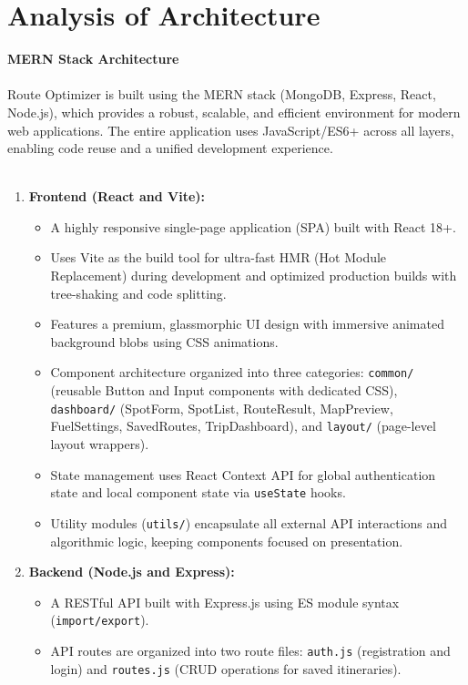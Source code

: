 \section{Analysis of Architecture}
{\large \textbf{MERN Stack Architecture}}\\\\
Route Optimizer is built using the MERN stack (MongoDB, Express, React, Node.js), which provides a robust, scalable, and efficient environment for modern web applications. The entire application uses JavaScript/ES6+ across all layers, enabling code reuse and a unified development experience.\\\\
\begin{enumerate}
    \item \textbf{Frontend (React and Vite):}
    \begin{itemize}
        \item A highly responsive single-page application (SPA) built with React 18+.
        \item Uses Vite as the build tool for ultra-fast HMR (Hot Module Replacement) during development and optimized production builds with tree-shaking and code splitting.
        \item Features a premium, glassmorphic UI design with immersive animated background blobs using CSS animations.
        \item Component architecture organized into three categories: \texttt{common/} (reusable Button and Input components with dedicated CSS), \texttt{dashboard/} (SpotForm, SpotList, RouteResult, MapPreview, FuelSettings, SavedRoutes, TripDashboard), and \texttt{layout/} (page-level layout wrappers).
        \item State management uses React Context API for global authentication state and local component state via \texttt{useState} hooks.
        \item Utility modules (\texttt{utils/}) encapsulate all external API interactions and algorithmic logic, keeping components focused on presentation.
    \end{itemize}
    \item \textbf{Backend (Node.js and Express):}
    \begin{itemize}
        \item A RESTful API built with Express.js using ES module syntax (\texttt{import/export}).
        \item API routes are organized into two route files: \texttt{auth.js} (registration and login) and \texttt{routes.js} (CRUD operations for saved itineraries).

\end{itemize}
\end{enumerate}
